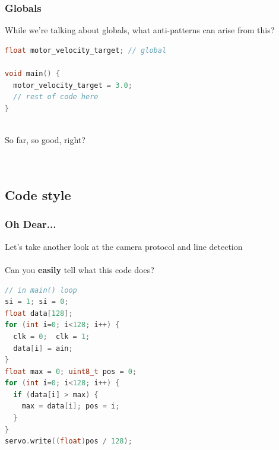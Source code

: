 \documentclass{beamer}
\begin{document}
\begin{frame}[fragile]
\frametitle{Globals}
While we're talking about globals, what anti-patterns can arise from this?
\hfill \\
\begin{lstlisting}[language=C++,basicstyle=\ttfamily\scriptsize]
float motor_velocity_target; // global

void main() {
  motor_velocity_target = 3.0;
  // rest of code here
}
\end{lstlisting}
\hfill \\
So far, so good, right? \\
\hfill \\
\hfill \\
\end{frame}


\subsection{Code style}
\begin{frame}[fragile]
\frametitle{Oh Dear...}
Let's take another look at the camera protocol and line detection \\
\hfill \\
Can you \textbf{easily} tell what this code does?
\begin{lstlisting}[language=C++,basicstyle=\ttfamily\scriptsize]
// in main() loop
si = 1; si = 0;
float data[128];
for (int i=0; i<128; i++) {
  clk = 0;  clk = 1;
  data[i] = ain;
}
float max = 0; uint8_t pos = 0;
for (int i=0; i<128; i++) {
  if (data[i] > max) {
    max = data[i]; pos = i;
  }
}
servo.write((float)pos / 128);
\end{lstlisting}
\vspace{2px}
\end{frame}
\end{document}
